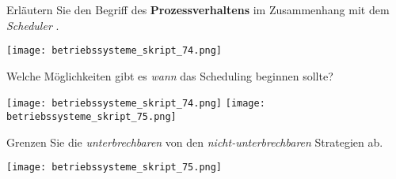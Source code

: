 \documentclass{article}
\begin{document}
\begin{tcolorbox}[colback=white!10!white,colframe=lightgray!75!black,
  savelowerto=\jobname_ex.tex,breakable,enhanced,lines before break=40]

\begin{center}
Erläutern Sie den Begriff des 
\textbf{Prozessverhaltens
} im Zusammenhang mit dem 
\textit{Scheduler
}.

\end{center}

\tcblower

\justifying
\texttt{[image: betriebssysteme\_skript\_74.png]}

\end{tcolorbox}
\begin{tcolorbox}[colback=white!10!white,colframe=lightgray!75!black,
  savelowerto=\jobname_ex.tex,breakable,enhanced,lines before break=40]

\begin{center}
Welche Möglichkeiten gibt es 
\textit{wann
} das Scheduling beginnen sollte?

\end{center}

\tcblower

\justifying
\texttt{[image: betriebssysteme\_skript\_74.png]}
\texttt{[image: betriebssysteme\_skript\_75.png]}

\end{tcolorbox}
\begin{tcolorbox}[colback=white!10!white,colframe=lightgray!75!black,
  savelowerto=\jobname_ex.tex,breakable,enhanced,lines before break=40]

\begin{center}
Grenzen Sie die 
\textit{unterbrechbaren
} von den 
\textit{nicht-unterbrechbaren
} Strategien ab.

\end{center}

\tcblower

\justifying
\texttt{[image: betriebssysteme\_skript\_75.png]}

\end{tcolorbox}
\end{document}
